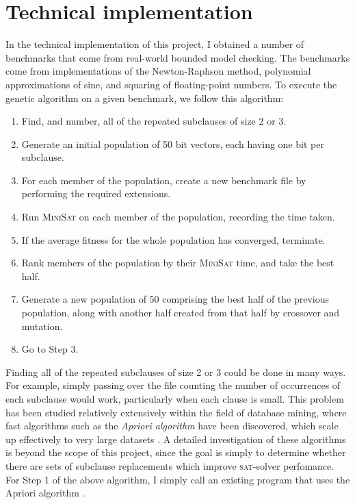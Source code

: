 \documentclass[proof,pdftex,11pt,a4,titlepage]{article}
\newcommand{\sat}{\textsc{sat}}
\begin{document}

\section{Technical implementation}

In the technical implementation of this project, I obtained a number of benchmarks that come from real-world bounded model checking. The benchmarks come from implementations of the Newton-Raphson method, polynomial approximations of sine, and squaring of floating-point numbers. To execute the genetic algorithm on a given benchmark, we follow this algorithm:

\begin{samepage}
  \begin{enumerate}
    \item Find, and number, all of the repeated subclauses of size 2 or 3.
    \item Generate an initial population of 50 bit vectors, each having one bit per subclause.
    \item For each member of the population, create a new benchmark file by performing the required extensions.
    \item Run \textsc{MiniSat} on each member of the population, recording the time taken.
    \item If the average fitness for the whole population has converged, terminate.
    \item Rank members of the population by their \textsc{MiniSat} time, and take the best half.
    \item Generate a new population of 50 comprising the best half of the previous population, along with another half created from that half by crossover and mutation.
    \item Go to Step 3.
  \end{enumerate}
\end{samepage}

Finding all of the repeated subclauses of size 2 or 3 could be done in many ways. For example, simply passing over the file counting the number of occurrences of each subclause would work, particularly when each clause is small. This problem has been studied relatively extensively within the field of database mining, where fast algorithms such as the \emph{Apriori algorithm} have been discovered, which scale up effectively to very large datasets \cite{Agrawal:1994}. A detailed investigation of these algorithms is beyond the scope of this project, since the goal is simply to determine whether there are sets of subclause replacements which improve \sat{}-solver perfomance. For Step 1 of the above algorithm, I simply call an existing program that uses the Apriori algorithm \cite{Borgelt:2003}.
\end{document}
